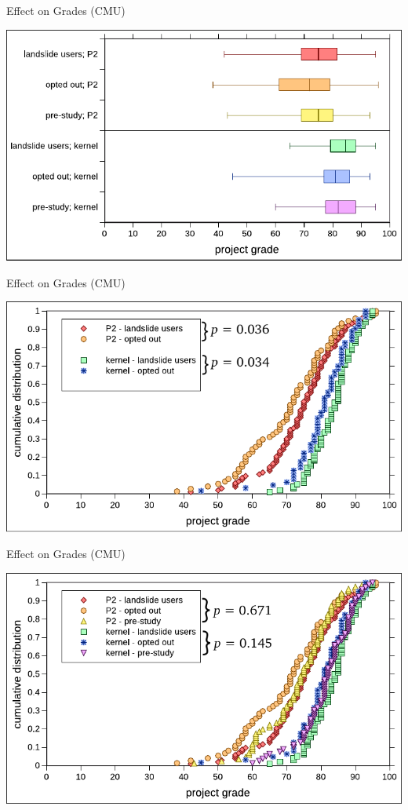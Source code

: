 \documentclass[xcolor=dvipsnames]{beamer}
\begin{document}
\begin{frame}{Effect on Grades (CMU)}
	\begin{center}
		\includegraphics[width=\textwidth]{../photo-of-ze-studence.pdf}
	\end{center}
\end{frame}
\begin{frame}{Effect on Grades (CMU)} %
	\begin{center}
		\includegraphics[width=\textwidth]{photo-of-ze-studence-cdf-no-pre-study.pdf}
	\end{center}
\end{frame}
\begin{frame}{Effect on Grades (CMU)} %
	\begin{center}
		\includegraphics[width=\textwidth]{photo-of-ze-studence-cdf.pdf}
	\end{center}
\end{frame}
\end{document}
